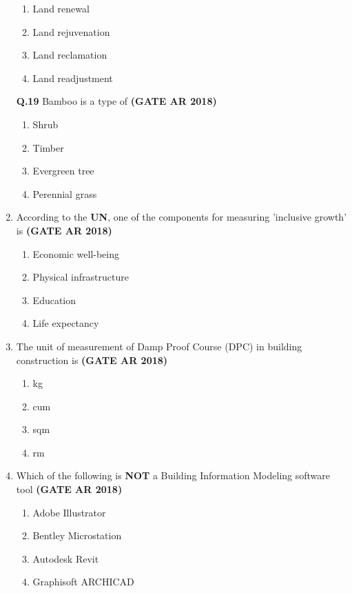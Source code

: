 \documentclass[journal,15pt,onecolumn]{IEEEtran}
\theoremstyle{remark}
\begin{document}
\begin{enumerate}
\begin{enumerate}
\item   Land renewal 
\item   Land rejuvenation 
\item   Land reclamation
\item   Land readjustment 
\end{enumerate}

\vspace{0.5cm}

\textbf{Q.19} \hspace{0.3cm} Bamboo is a type of\hfill \textbf{ (GATE AR 2018)}


\begin{enumerate}
\item   Shrub 
\item    Timber 
\item   Evergreen tree 
\item    Perennial grass 
\end{enumerate}


\item 
According to the \textbf{UN}, one of the components for measuring 'inclusive growth' is\hfill \textbf{ (GATE AR 2018)}

\begin{enumerate}
    

\item   Economic well-being \item    Physical infrastructure 
\item   Education \item    Life expectancy 
\end{enumerate}



\item 
The unit of measurement of Damp Proof Course (DPC) in building construction is\hfill \textbf{ (GATE AR 2018)}

\begin{enumerate}
\item   kg \item    cum 
\item   sqm \item   rm 
\end{enumerate}



\item 
Which of the following is \textbf{NOT} a Building Information Modeling software tool\hfill \textbf{ (GATE AR 2018)}

\begin{enumerate}
\item   Adobe Illustrator \item     Bentley Microstation
    \item    Autodesk Revit  \item   Graphisoft ARCHICAD 
\end{enumerate}




\end{enumerate}
\end{document}
